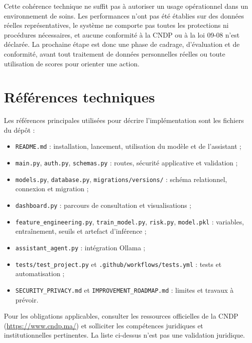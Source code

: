 \documentclass[11pt,a4paper]{report}
\newcommand{\code}[1]{\texttt{#1}}
\begin{document}
Cette cohérence technique ne suffit pas à autoriser un usage opérationnel
dans un environnement de soins. Les performances n'ont pas été établies sur
des données réelles représentatives, le système ne comporte pas toutes les
protections ni procédures nécessaires, et aucune conformité à la CNDP ou à la
loi 09-08 n'est déclarée. La prochaine étape est donc une phase de cadrage,
d'évaluation et de conformité, avant tout traitement de données personnelles
réelles ou toute utilisation de scores pour orienter une action.

\chapter*{Références techniques}
Les références principales utilisées pour décrire l'implémentation sont les
fichiers du dépôt :
\begin{itemize}
  \item \code{README.md} : installation, lancement, utilisation du modèle et
        de l'assistant ;
  \item \code{main.py}, \code{auth.py}, \code{schemas.py} : routes, sécurité
        applicative et validation ;
  \item \code{models.py}, \code{database.py}, \code{migrations/versions/} :
        schéma relationnel, connexion et migration ;
  \item \code{dashboard.py} : parcours de consultation et visualisations ;
  \item \code{feature\_engineering.py}, \code{train\_model.py},
        \code{risk.py}, \code{model.pkl} : variables, entraînement, seuils
        et artefact d'inférence ;
  \item \code{assistant\_agent.py} : intégration Ollama ;
  \item \code{tests/test\_project.py} et
        \code{.github/workflows/tests.yml} : tests et automatisation ;
  \item \code{SECURITY\_PRIVACY.md} et
        \code{IMPROVEMENT\_ROADMAP.md} : limites et travaux à prévoir.
\end{itemize}
Pour les obligations applicables, consulter les ressources officielles de la
CNDP (\url{https://www.cndp.ma/}) et solliciter les compétences juridiques et
institutionnelles pertinentes. La liste ci-dessus n'est pas une validation
juridique.

\appendix
\end{document}
